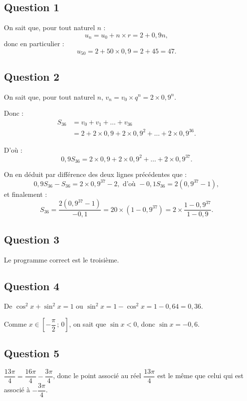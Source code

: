 \subsection*{Question 1}

On sait que, pour tout naturel \(n\) :
\[
u_n = u_0 + n \times r = 2 + 0{,}9n,
\]
donc en particulier :
\[
u_{50} = 2 + 50 \times 0{,}9 = 2 + 45 = 47.
\]

\subsection*{Question 2}

On sait que, pour tout naturel \(n\), \(v_n = v_0 \times q^n = 2 \times 0{,}9^n\).

Donc :
\begin{align*}
S_{36} &= v_0 + v_1 + \ldots + v_{36} \\
&= 2 + 2 \times 0{,}9 + 2 \times 0{,}9^2 + \ldots + 2 \times 0{,}9^{36}.
\end{align*}

D'où :
\[
0{,}9 S_{36} = 2 \times 0{,}9 + 2 \times 0{,}9^2 + \ldots + 2 \times 0{,}9^{37}.
\]

On en déduit par différence des deux lignes précédentes que :
\[
0{,}9 S_{36} - S_{36} = 2 \times 0{,}9^{37} - 2, \text{ d'où } -0{,}1 S_{36} = 2 \left(0{,}9^{37} - 1\right),
\]
et finalement :
\[
S_{36} = \dfrac{2 \left(0{,}9^{37} - 1\right)}{-0{,}1} = 20 \times (1 - 0{,}9^{37}) = 2 \times \dfrac{1 - 0{,}9^{37}}{1 - 0{,}9}.
\]

\subsection*{Question 3}

Le programme correct est le troisième.

\subsection*{Question 4}

De \( \cos^2 x + \sin^2 x = 1 \) ou \( \sin^2 x = 1 - \cos^2 x = 1 - 0{,}64 = 0{,}36 \).

Comme \( x \in \left[-\dfrac{\pi}{2} \,;\, 0\right] \), on sait que \( \sin x < 0 \), donc \( \sin x = -0{,}6 \).

\subsection*{Question 5}

\(\dfrac{13\pi}{4} = \dfrac{16\pi}{4} - \dfrac{3\pi}{4}\), donc le point associé au réel \( \dfrac{13\pi}{4} \) est le même que celui qui est associé à \( -\dfrac{3\pi}{4} \).
